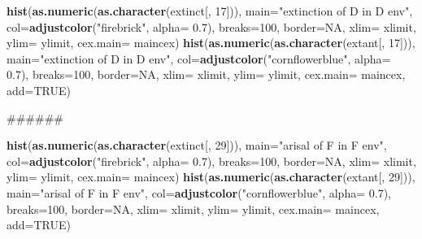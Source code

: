 \documentclass[]{book}
\newenvironment{Shaded}{\begin{snugshade}}{\end{snugshade}}
\newcommand{\KeywordTok}[1]{\textcolor[rgb]{0.13,0.29,0.53}{\textbf{{#1}}}}
\newcommand{\DataTypeTok}[1]{\textcolor[rgb]{0.13,0.29,0.53}{{#1}}}
\newcommand{\DecValTok}[1]{\textcolor[rgb]{0.00,0.00,0.81}{{#1}}}
\newcommand{\FloatTok}[1]{\textcolor[rgb]{0.00,0.00,0.81}{{#1}}}
\newcommand{\StringTok}[1]{\textcolor[rgb]{0.31,0.60,0.02}{{#1}}}
\newcommand{\OtherTok}[1]{\textcolor[rgb]{0.56,0.35,0.01}{{#1}}}
\newcommand{\NormalTok}[1]{{#1}}
\theoremstyle{definition}
\theoremstyle{definition}
\theoremstyle{remark}
\begin{document}
\begin{Shaded}
\begin{Highlighting}[]
\KeywordTok{hist}\NormalTok{(}\KeywordTok{as.numeric}\NormalTok{(}\KeywordTok{as.character}\NormalTok{(extinct[, }\DecValTok{17}\NormalTok{])), }\DataTypeTok{main=}\StringTok{"extinction of D in D env"}\NormalTok{, }\DataTypeTok{col=}\KeywordTok{adjustcolor}\NormalTok{(}\StringTok{"firebrick"}\NormalTok{, }\DataTypeTok{alpha=} \FloatTok{0.7}\NormalTok{), }\DataTypeTok{breaks=}\DecValTok{100}\NormalTok{, }\DataTypeTok{border=}\OtherTok{NA}\NormalTok{, }\DataTypeTok{xlim=}\NormalTok{ xlimit, }\DataTypeTok{ylim=}\NormalTok{ ylimit, }\DataTypeTok{cex.main=}\NormalTok{ maincex)}
\KeywordTok{hist}\NormalTok{(}\KeywordTok{as.numeric}\NormalTok{(}\KeywordTok{as.character}\NormalTok{(extant[, }\DecValTok{17}\NormalTok{])), }\DataTypeTok{main=}\StringTok{"extinction of D in D env"}\NormalTok{, }\DataTypeTok{col=}\KeywordTok{adjustcolor}\NormalTok{(}\StringTok{"cornflowerblue"}\NormalTok{, }\DataTypeTok{alpha=} \FloatTok{0.7}\NormalTok{), }\DataTypeTok{breaks=}\DecValTok{100}\NormalTok{, }\DataTypeTok{border=}\OtherTok{NA}\NormalTok{, }\DataTypeTok{xlim=}\NormalTok{ xlimit, }\DataTypeTok{ylim=}\NormalTok{ ylimit, }\DataTypeTok{cex.main=}\NormalTok{ maincex, }\DataTypeTok{add=}\OtherTok{TRUE}\NormalTok{)}

\NormalTok{######}

\KeywordTok{hist}\NormalTok{(}\KeywordTok{as.numeric}\NormalTok{(}\KeywordTok{as.character}\NormalTok{(extinct[, }\DecValTok{29}\NormalTok{])), }\DataTypeTok{main=}\StringTok{"arisal of F in F env"}\NormalTok{, }\DataTypeTok{col=}\KeywordTok{adjustcolor}\NormalTok{(}\StringTok{"firebrick"}\NormalTok{, }\DataTypeTok{alpha=} \FloatTok{0.7}\NormalTok{), }\DataTypeTok{breaks=}\DecValTok{100}\NormalTok{, }\DataTypeTok{border=}\OtherTok{NA}\NormalTok{, }\DataTypeTok{xlim=}\NormalTok{ xlimit, }\DataTypeTok{ylim=}\NormalTok{ ylimit, }\DataTypeTok{cex.main=}\NormalTok{ maincex)}
\KeywordTok{hist}\NormalTok{(}\KeywordTok{as.numeric}\NormalTok{(}\KeywordTok{as.character}\NormalTok{(extant[, }\DecValTok{29}\NormalTok{])), }\DataTypeTok{main=}\StringTok{"arisal of F in F env"}\NormalTok{, }\DataTypeTok{col=}\KeywordTok{adjustcolor}\NormalTok{(}\StringTok{"cornflowerblue"}\NormalTok{, }\DataTypeTok{alpha=} \FloatTok{0.7}\NormalTok{), }\DataTypeTok{breaks=}\DecValTok{100}\NormalTok{, }\DataTypeTok{border=}\OtherTok{NA}\NormalTok{, }\DataTypeTok{xlim=}\NormalTok{ xlimit, }\DataTypeTok{ylim=}\NormalTok{ ylimit, }\DataTypeTok{cex.main=}\NormalTok{ maincex, }\DataTypeTok{add=}\OtherTok{TRUE}\NormalTok{)}




\end{Highlighting}
\end{Shaded}
\end{document}
